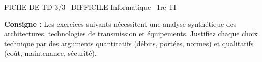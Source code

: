 \documentclass[11pt]{article}
\begin{document}
\begin{tcolorbox}[enhanced,colback=popink,colframe=popink,arc=10pt,boxrule=0pt,left=12pt,right=12pt,top=9pt,bottom=9pt]
{\color{white}\popxbold\small FICHE DE TD 3/3 \textbullet\ DIFFICILE \hfill Informatique \textbullet\ 1re TI\par}
\end{tcolorbox}
\vspace{4pt}
\noindent \textbf{Consigne :} Les exercices suivants nécessitent une analyse synthétique des architectures, technologies de transmission et équipements. Justifiez chaque choix technique par des arguments quantitatifs (débits, portées, normes) et qualitatifs (coût, maintenance, sécurité).
\end{document}
